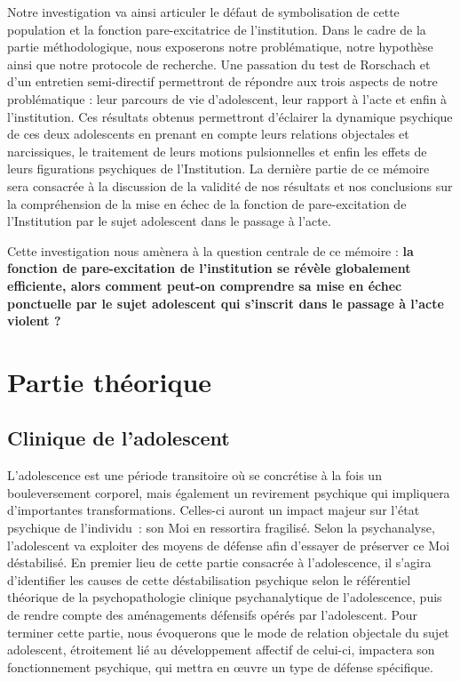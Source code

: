 \documentclass[12pt, a4paper]{book}
\begin{document}
\begin{spacing}{1.5}
Notre investigation va ainsi articuler le défaut de symbolisation de cette population et la fonction pare-excitatrice de l'institution. Dans le cadre de la partie méthodologique, nous exposerons notre problématique, notre hypothèse ainsi que notre protocole de recherche. Une passation du test de Rorschach et d’un entretien semi-directif permettront de répondre aux trois aspects de notre problématique : leur parcours de vie d’adolescent, leur rapport à l'acte et enfin à l'institution. Ces résultats obtenus permettront d'éclairer la  dynamique psychique de ces deux adolescents en prenant en compte leurs relations objectales et narcissiques, le traitement de leurs motions pulsionnelles et enfin les effets de leurs figurations psychiques de l'Institution. La dernière partie de ce mémoire sera consacrée à la discussion de la validité de nos résultats et nos conclusions sur la compréhension de la mise en échec de la fonction de pare-excitation de l'Institution par le sujet adolescent dans le passage à l'acte.

Cette investigation nous amènera à la question centrale de ce mémoire : \textbf{la fonction de pare-excitation de l’institution se révèle globalement efficiente, alors comment peut-on comprendre sa mise en échec ponctuelle par le sujet adolescent qui s'inscrit dans le passage à l'acte violent ?}

\tableofcontents
\thispagestyle{empty}

\mainmatter

\part{Partie théorique}

\chapter{Clinique de l'adolescent}

L'adolescence est une période transitoire où se concrétise à la fois un bouleversement corporel, mais également un revirement psychique qui impliquera d'importantes transformations. Celles-ci auront un impact majeur sur l'état psychique de l'individu : son Moi en ressortira fragilisé. Selon la psychanalyse, l'adolescent va exploiter des moyens de défense afin d'essayer de préserver ce Moi déstabilisé. En premier lieu de cette partie consacrée à l'adolescence, il s'agira d'identifier les causes de cette déstabilisation psychique selon le référentiel théorique de la psychopathologie clinique psychanalytique de l'adolescence, puis de rendre compte des aménagements défensifs opérés par l'adolescent. Pour terminer cette partie, nous évoquerons que le mode de relation objectale du sujet adolescent, étroitement lié au développement affectif de celui-ci, impactera son fonctionnement psychique, qui mettra en œuvre un type de défense spécifique.


\end{spacing}
\end{document}
